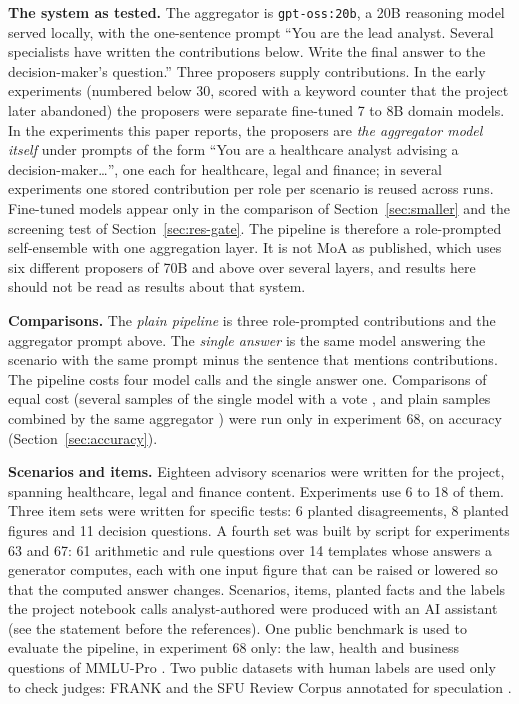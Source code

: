 \documentclass[10pt,twocolumn]{article}
\begin{document}
\textbf{The system as tested.} The aggregator is
\texttt{gpt-oss:20b}, a 20B reasoning model served locally, with the
one-sentence prompt ``You are the lead analyst. Several specialists
have written the contributions below. Write the final answer to the
decision-maker's question.'' Three proposers supply contributions. In
the early experiments (numbered below 30, scored with a keyword
counter that the project later abandoned) the proposers were separate
fine-tuned 7 to 8B domain models. In the experiments this paper
reports, the proposers are \emph{the aggregator model itself} under
prompts of the form ``You are a healthcare analyst advising a
decision-maker\ldots'', one each for healthcare, legal and finance; in
several experiments one stored contribution per role per scenario is
reused across runs. Fine-tuned models appear only in the comparison of
Section~\ref{sec:smaller} and the screening test of
Section~\ref{sec:res-gate}. The pipeline is therefore a role-prompted
self-ensemble with one aggregation layer. It is not MoA as published,
which uses six different proposers of 70B and above over several
layers, and results here should not be read as results about that
system.

\textbf{Comparisons.} The \emph{plain pipeline} is three role-prompted
contributions and the aggregator prompt above. The \emph{single answer}
is the same model answering the scenario with the same prompt minus the
sentence that mentions contributions. The pipeline costs four model
calls and the single answer one. Comparisons of equal cost (several
samples of the single model with a vote
\cite{wang2023selfconsistency,li2024moreagents}, and plain samples
combined by the same aggregator \cite{li2025selfmoa}) were run only in
experiment 68, on accuracy (Section~\ref{sec:accuracy}).

\textbf{Scenarios and items.} Eighteen advisory scenarios were written
for the project, spanning healthcare, legal and finance content.
Experiments use 6 to 18 of them. Three item sets were written for
specific tests: 6 planted disagreements, 8 planted figures and 11
decision questions. A fourth set was built by script for experiments 63
and 67: 61 arithmetic and rule questions over 14 templates whose
answers a generator computes, each with one input figure that can be
raised or lowered so that the computed answer changes. Scenarios,
items, planted facts and the labels the project notebook calls
analyst-authored were produced with an AI assistant (see the statement
before the references). One public benchmark is used to evaluate the
pipeline, in experiment 68 only: the law, health and business questions
of MMLU-Pro \cite{wang2024mmlupro}. Two public datasets with human
labels are used only to check judges: FRANK \cite{pagnoni2021frank} and
the SFU Review Corpus annotated for speculation
\cite{konstantinova2012sfu}.
\end{document}
